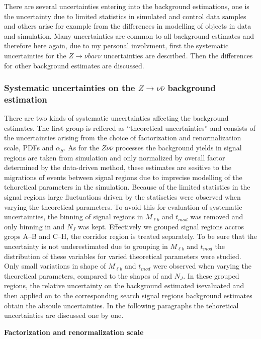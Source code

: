 There are several uncertainties entering into the background estimations, one is the uncertainty due to limited statistics in simulated and control data samples and others arise for example from the differences in modelling of objects in data and simulation. Many uncertainties are common to all background estimates and therefore here again, due to my personal involvment, first the systematic uncertainties for the $Z \to \nu bar{\nu}$ uncertainties are described.  Then the differences for other background estimates are discussed.

\subsubsection{Systematic uncertainties on the $Z \to \nu \bar{\nu}$ background estimation}

There are two kinds of systematic uncertainties affecting the background estimates. The first group is reffered as ``theoretical uncertainties'' and consists of the uncertainties arising from the choice of factorization and renormalization scale, PDFs and $\alpha_{S}$. As for the $Z \nu \bar{\nu}$ processes the background yields in signal regions are taken from simulation and only normalized by overall factor determined by the data-driven method, these estimates are sesitive to the migrations of events between signal regions due to imprecise modelling of the tehoretical parameters in the simulation. Because of the limited statistics in the signal regions large fluctuations driven by the statisctics were observed when varying the theoretical parameters. To avoid this for evaluation of systematic uncertainties, the binning of signal regions in $M_{\ell b}$ and $t_{mod}$ was removed and only binning in \MET and $N_{J}$ was kept. Effectively we grouped signal regions accros grops A--B and C--H, the corridor region is treated separately. To be sure that the uncertainty is not underestimated due to grouping in $M_{\ell b}$ and $t_{mod}$ the distribution of these variables for varied theoretical parameters were studied. Only small variations in shape of $M_{\ell b}$ and $t_{mod}$ were observed when varying the theoretical parameters, compared to the shapes of \MET and $N_{J}$. In these grouped regions, the relative uncertainty on the background estimated isevaluated and then applied on to the corresponding search signal regions background estimates obtain the absoule uncertainties. In the following paragraphs the tehoretical uncertainties are discussed one by one.


\textbf{Factorization and renormalization scale}

